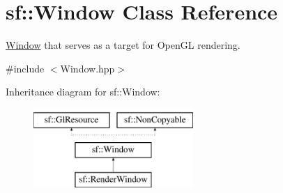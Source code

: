 \hypertarget{classsf_1_1_window}{}\section{sf\+:\+:Window Class Reference}
\label{classsf_1_1_window}


\mbox{\hyperlink{classsf_1_1_window}{Window}} that serves as a target for Open\+GL rendering.  




{\ttfamily \#include $<$Window.\+hpp$>$}

Inheritance diagram for sf\+:\+:Window\+:\begin{figure}[H]
\begin{center}
\leavevmode
\includegraphics[height=3.000000cm]{classsf_1_1_window}
\end{center}
\end{figure}
